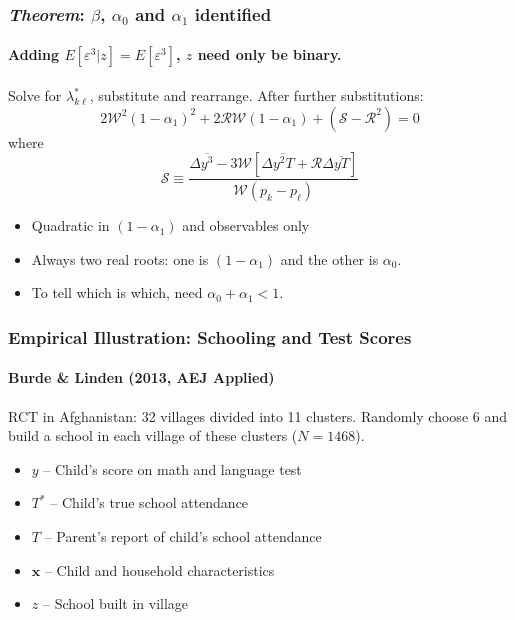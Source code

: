 \documentclass{beamer}
\begin{document}
\begin{frame}
  \frametitle{\emph{Theorem}: $\beta$, $\alpha_0$ and $\alpha_1$ identified}
  \framesubtitle{Adding $E[\varepsilon^3|z] = E[\varepsilon^3]$, $z$ need only be binary.}

    Solve for $\lambda^*_{k\ell}$, substitute and rearrange.
    After further substitutions:
  \begin{equation*}
    2\mathcal{W}^2 (1-\alpha_1)^2 + 2 \mathcal{R}\mathcal{W} (1-\alpha_1) + (\mathcal{S} -\mathcal{R}^2) = 0
  \end{equation*}
  where
  \begin{equation*}
    \mathcal{S} \equiv \frac{\Delta\overline{y^3} - 3 \mathcal{W}\left[ \Delta\overline{y^2T}+\mathcal{R}\Delta\overline{yT} \right]}{\mathcal{W}(p_k - p_\ell)}
  \end{equation*}

  \begin{itemize}
    \item Quadratic in $(1-\alpha_1)$ and observables only
    \item Always two real roots: one is $(1-\alpha_1)$ and the other is $\alpha_0$.
    \item To tell which is which, need $\alpha_0 + \alpha_1 < 1$.
  \end{itemize}


\end{frame}
\begin{frame}
  \frametitle{Empirical Illustration: Schooling and Test Scores}
\framesubtitle{Burde \& Linden (2013, AEJ Applied)}
  RCT in Afghanistan: 32 villages divided into 11 clusters. Randomly choose 6 and build a school in each village of these clusters ($N = 1468$).

\begin{itemize}
  \item $y$ -- Child's score on math and language test 
  \item $T^*$ -- Child's true school attendance
  \item $T$ -- Parent's report of child's school attendance
  \item $\mathbf{x}$ -- Child and household characteristics
  \item $z$ -- School built in village
\end{itemize}
\end{frame}
\end{document}
